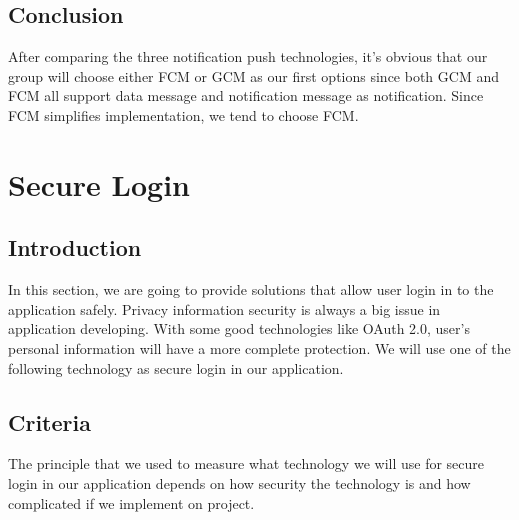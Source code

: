 \documentclass[letterpaper, 10pt,titlepage]{article}
\begin{document}
\subsection{Conclusion}
After comparing the three notification push technologies, it's obvious that our group will choose either FCM or GCM as our first options since both GCM and FCM all support data message and notification message as notification. Since FCM simplifies implementation, we tend to choose FCM.\\

\section{Secure Login}

\subsection{Introduction}
In this section, we are going to provide solutions that allow user login in to the application safely. Privacy information security is always a big issue in application developing. With some good technologies like OAuth 2.0, user’s personal information will have a more complete protection. We will use one of the following technology as secure login in our application. \\

\subsection{Criteria}
The principle that we used to measure what technology we will use for secure login in our application depends on how security the technology is and how complicated if we implement on project.
\end{document}
